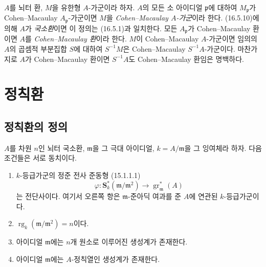\begin{env}[16.5.13]
\label{0.16.5.13-fr}
$A$를 뇌터 환, $M$을 유한형 $A$-가군이라 하자. $A$의 모든 소
아이디얼 $\mathfrak{p}$에 대하여 $M_{\mathfrak{p}}$가
Cohen--Macaulay $A_{\mathfrak{p}}$-가군이면 $M$을
\emph{Cohen--Macaulay $A$-가군}이라 한다. (16.5.10)에 의해 $A$가
\emph{국소환}이면 이 정의는 (16.5.1)과 일치한다. 모든
$A_{\mathfrak{p}}$가 Cohen--Macaulay 환이면 $A$를
\emph{Cohen--Macaulay 환}이라 한다. $M$이 Cohen--Macaulay
$A$-가군이면 임의의 $A$의 곱셈적 부분집합 $S$에 대하여
$S^{-1}M$은 Cohen--Macaulay $S^{-1}A$-가군이다. 마찬가지로 $A$가
Cohen--Macaulay 환이면 $S^{-1}A$도 Cohen--Macaulay 환임은 명백하다.
\end{env}

\section{정칙환}
\label{section:0.17-fr}

\subsection{정칙환의 정의}
\label{subsection:0.17.1-fr}

\begin{proposition}[17.1.1]
\label{0.17.1.1-fr}
$A$를 차원 $n$인 뇌터 국소환, $\mathfrak{m}$을 그 극대 아이디얼,
$k=A/\mathfrak{m}$을 그 잉여체라 하자. 다음 조건들은 서로 동치이다.
\begin{enumerate}
  \item[\rm a)] $k$-등급가군의 정준 전사 준동형 (15.1.1.1)
  \[
    \varphi:\mathbf{S}^*_k(\mathfrak{m}/\mathfrak{m}^2)
    \longrightarrow\operatorname{gr}^*_{\mathfrak{m}}(A)
  \]
  는 전단사이다. 여기서 오른쪽 항은 $\mathfrak{m}$-준아딕 여과를 준
  $A$에 연관된 $k$-등급가군이다.
  \item[\rm b)]
  $\operatorname{rg}_k(\mathfrak{m}/\mathfrak{m}^2)=n$이다.
  \item[\rm c)] 아이디얼 $\mathfrak{m}$에는 $n$개 원소로 이루어진
  생성계가 존재한다.
  \item[\rm d)] 아이디얼 $\mathfrak{m}$에는 $A$-정칙열인 생성계가
  존재한다.
\end{enumerate}
\end{proposition}

